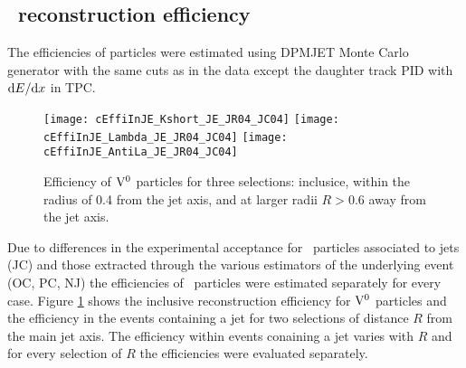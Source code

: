 
\subsection{\Vzero\ reconstruction efficiency}
\label{sec:c05V0EffiMC}

The efficiencies of \Vzero particles were estimated using DPMJET Monte Carlo generator \cite{Roesler:2000he} with the same cuts as in the data except the daughter track PID with ${\rm d}E/{\rm d}x$ in TPC. 

\begin{figure}[htb]
\begin{center}
\texttt{[image: cEffiInJE\_Kshort\_JE\_JR04\_JC04]}
\texttt{[image: cEffiInJE\_Lambda\_JE\_JR04\_JC04]}
\texttt{[image: cEffiInJE\_AntiLa\_JE\_JR04\_JC04]}
\caption{Efficiency of ${\rm V}^{0}$ particles for three selections: inclusice, within the radius of 0.4 from the jet axis, and at larger radii $R>0.6$ away from the jet axis.}
\label{fig:c02EffiIncV0s}
\end{center}
\end{figure}

Due to differences in the experimental acceptance for \Vzero\ particles associated to jets (JC) and those extracted through the various estimators of the underlying event (OC, PC, NJ) the efficiencies of \Vzero\ particles were estimated separately for every case. Figure \ref{fig:c02EffiIncV0s} shows the inclusive reconstruction efficiency for ${\rm V}^{0}$ particles and the efficiency in the events containing a jet for two selections of distance $R$ from the main jet axis. The efficiency within events conaining a jet varies with $R$ and for every selection of $R$ the efficiencies were evaluated separately.

